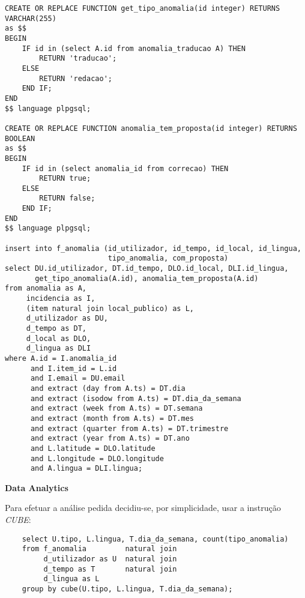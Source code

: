 \documentclass[12pt]{report}
\begin{document}
\begin{verbatim}
CREATE OR REPLACE FUNCTION get_tipo_anomalia(id integer) RETURNS VARCHAR(255)
as $$
BEGIN
    IF id in (select A.id from anomalia_traducao A) THEN
        RETURN 'traducao';
    ELSE
        RETURN 'redacao';
    END IF;
END
$$ language plpgsql;

CREATE OR REPLACE FUNCTION anomalia_tem_proposta(id integer) RETURNS BOOLEAN
as $$
BEGIN
    IF id in (select anomalia_id from correcao) THEN
        RETURN true;
    ELSE
        RETURN false;
    END IF;
END
$$ language plpgsql;

insert into f_anomalia (id_utilizador, id_tempo, id_local, id_lingua,
                        tipo_anomalia, com_proposta)
select DU.id_utilizador, DT.id_tempo, DLO.id_local, DLI.id_lingua,
       get_tipo_anomalia(A.id), anomalia_tem_proposta(A.id)
from anomalia as A,
     incidencia as I,
     (item natural join local_publico) as L,
     d_utilizador as DU,
     d_tempo as DT,
     d_local as DLO,
     d_lingua as DLI
where A.id = I.anomalia_id
      and I.item_id = L.id
      and I.email = DU.email
      and extract (day from A.ts) = DT.dia
      and extract (isodow from A.ts) = DT.dia_da_semana
      and extract (week from A.ts) = DT.semana
      and extract (month from A.ts) = DT.mes
      and extract (quarter from A.ts) = DT.trimestre
      and extract (year from A.ts) = DT.ano
      and L.latitude = DLO.latitude
      and L.longitude = DLO.longitude
      and A.lingua = DLI.lingua;
    \end{verbatim}


    \Large
    \textbf{Data Analytics}\\
    \normalsize
    \par Para efetuar a análise pedida decidiu-se, por simplicidade, usar a instrução \textit{CUBE}:
    \footnotesize \begin{verbatim}
    select U.tipo, L.lingua, T.dia_da_semana, count(tipo_anomalia)
    from f_anomalia         natural join
         d_utilizador as U  natural join
         d_tempo as T       natural join
         d_lingua as L
    group by cube(U.tipo, L.lingua, T.dia_da_semana);
    \end{verbatim}\normalsize
\end{document}
